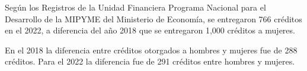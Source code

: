Según los Registros de la Unidad Financiera Programa Nacional para el Desarrollo de la MIPYME del Ministerio de Economía, se entregaron 766 créditos en el 2022, a diferencia del año 2018 que se entregaron 1,000 créditos a mujeres.

En el 2018 la diferencia entre créditos otorgados a hombres y mujeres fue de 288 créditos. Para el 2022 la diferencia fue de 291 créditos entre hombres y mujeres. 